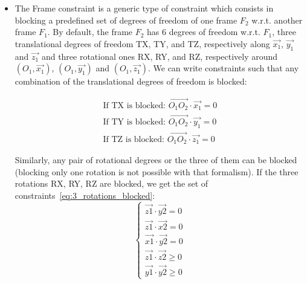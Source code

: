 \begin{itemize}

\item The Frame constraint is a generic type of constraint which consists in blocking a predefined set of degrees of freedom of one frame $F_2$ w.r.t. another frame $F_1$.
By default, the frame $F_2$ has 6 degrees of freedom w.r.t. $F_1$, three translational degrees of freedom TX, TY, and TZ, respectively along $\vec{x_1}$, $\vec{y_1}$ and $\vec{z_1}$ and three rotational ones RX, RY, and RZ, respectively around $(O_1,\vec{x_1})$, $(O_1,\vec{y_1})$ and $(O_1,\vec{z_1})$.
We can write constraints such that any combination of the translational degrees of freedom is blocked:

\begin{align}
  \text{If TX is blocked: } \overrightarrow{O_1 O_2} \cdot \vec{x_1} = 0 \\
  \text{If TY is blocked: } \overrightarrow{O_1 O_2} \cdot \vec{y_1} = 0 \\
  \text{If TZ is blocked: } \overrightarrow{O_1 O_2} \cdot \vec{z_1} = 0
\end{align}

Similarly, any pair of rotational degrees or the three of them can be blocked (blocking only one rotation is not possible with that formalism).
If the three rotations RX, RY, RZ are blocked, we get the set of constraints~\ref{eq:3_rotations_blocked}:
\begin{equation}
\label{eq:3_rotations_blocked}
\begin{cases}
  \vec{z1}\cdot\vec{y2} = 0 \\
  \vec{z1}\cdot\vec{x2} = 0 \\
  \vec{x1}\cdot\vec{y2} = 0 \\
  \vec{z1}\cdot\vec{z2} \geq 0 \\
  \vec{y1}\cdot\vec{y2} \geq 0
\end{cases}
\end{equation}


\end{itemize}

